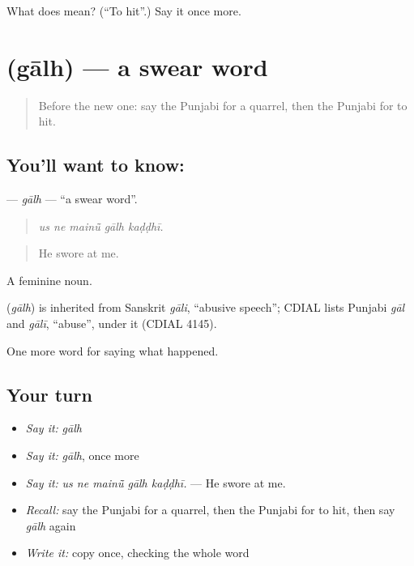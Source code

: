 \begin{tcolorbox}[breakable,colback=teal!4,colframe=teal!35!black,title={Before you move on}]
What does  mean? (\textquotedblleft{}To hit\textquotedblright{}.) Say it once more.
\end{tcolorbox}
\section[\texorpdfstring{\pa{ਗਾਲ੍ਹ} (gālh)}{ਗਾਲ੍ਹ (gālh)}]{ (gālh) — a swear word}

\label{lesson:PA-C316-galh}



\begin{quote}
Before the new one: say the Punjabi for a quarrel, then the Punjabi for to hit.
\end{quote}

\subsection*{You'll want to know: }
\textbf{} — \emph{gālh} — \textquotedblleft{}a swear word\textquotedblright{}.

\begin{quote}
    
\end{quote}

\begin{quote}
\emph{us ne mainū̃ gālh kaḍḍhī.}
\end{quote}

\begin{quote}
He swore at me.
\end{quote}

A feminine noun.

\begin{cousinweb}
\textbf{} (\emph{gālh}) is inherited from Sanskrit \emph{gāli}, \textquotedblleft{}abusive speech\textquotedblright{}; CDIAL lists Punjabi \emph{gāl} and \emph{gālī}, \textquotedblleft{}abuse\textquotedblright{}, under it (CDIAL 4145).
\end{cousinweb}

\begin{grammarlens}[title={What you've built}]
One more word for saying what happened.
\end{grammarlens}

\subsection*{Your turn}
\begin{itemize}
\raggedright
  \item \emph{Say it:} \emph{gālh}
  \item \emph{Say it:} \emph{gālh}, once more
  \item \emph{Say it:} \emph{us ne mainū̃ gālh kaḍḍhī.} — He swore at me.
  \item \emph{Recall:} say the Punjabi for a quarrel, then the Punjabi for to hit, then say \emph{gālh} again
  \item \emph{Write it:} copy \textbf{} once, checking the whole word
\end{itemize}

